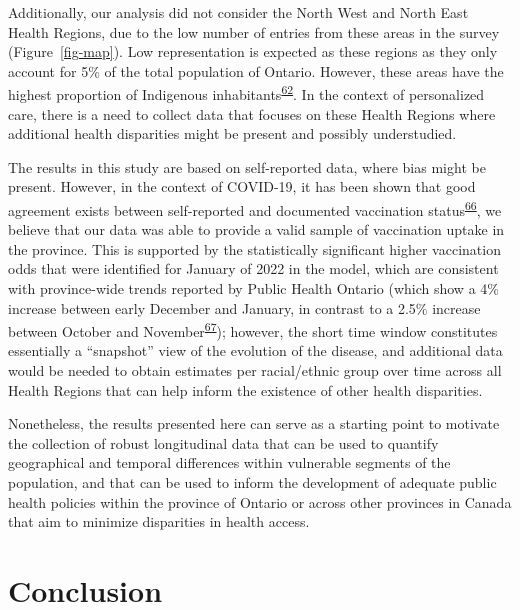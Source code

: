 \documentclass[
]{article}
\begin{document}
Additionally, our analysis did not consider the North West and North
East Health Regions, due to the low number of entries from these areas
in the survey (Figure~\ref{fig-map}). Low representation is expected as
these regions as they only account for 5\% of the total population of
Ontario. However, these areas have the highest proportion of Indigenous
inhabitants\textsuperscript{\protect\hyperlink{ref-ontariohealth}{62}}.
In the context of personalized care, there is a need to collect data
that focuses on these Health Regions where additional health disparities
might be present and possibly understudied.

The results in this study are based on self-reported data, where bias
might be present. However, in the context of COVID-19, it has been shown
that good agreement exists between self-reported and documented
vaccination
status\textsuperscript{\protect\hyperlink{ref-stephenson2022}{66}}, we
believe that our data was able to provide a valid sample of vaccination
uptake in the province. This is supported by the statistically
significant higher vaccination odds that were identified for January of
2022 in the model, which are consistent with province-wide trends
reported by Public Health Ontario (which show a 4\% increase between
early December and January, in contrast to a 2.5\% increase between
October and
November\textsuperscript{\protect\hyperlink{ref-ontario-covid}{67}});
however, the short time window constitutes essentially a ``snapshot''
view of the evolution of the disease, and additional data would be
needed to obtain estimates per racial/ethnic group over time across all
Health Regions that can help inform the existence of other health
disparities.

Nonetheless, the results presented here can serve as a starting point to
motivate the collection of robust longitudinal data that can be used to
quantify geographical and temporal differences within vulnerable
segments of the population, and that can be used to inform the
development of adequate public health policies within the province of
Ontario or across other provinces in Canada that aim to minimize
disparities in health access.

\hypertarget{conclusion}{%
\section{Conclusion}\label{conclusion}}
\end{document}
